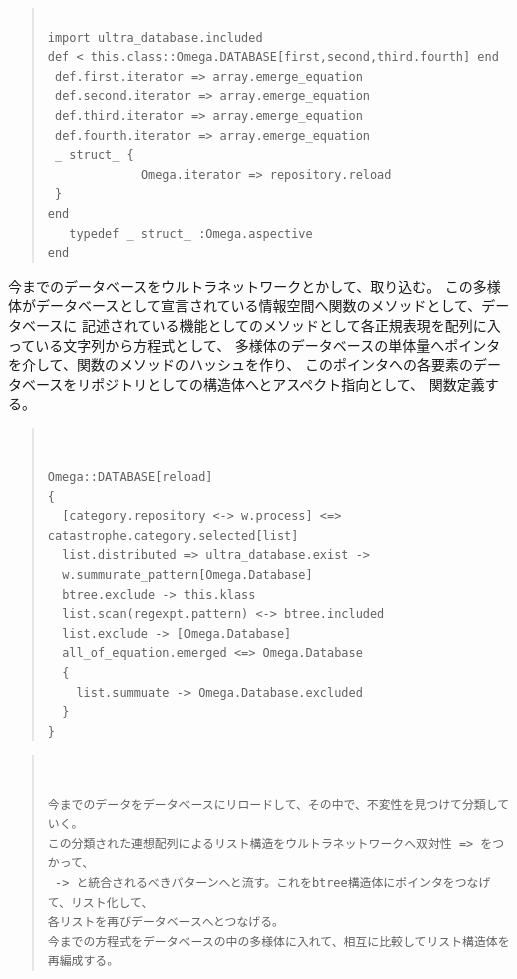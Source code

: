 \documentclass{jsarticle}
\begin{document}
   
\begin{quote}
\setlength{\baselineskip}{12pt}
\begin{verbatim}

import ultra_database.included
def < this.class::Omega.DATABASE[first,second,third.fourth] end
 def.first.iterator => array.emerge_equation
 def.second.iterator => array.emerge_equation
 def.third.iterator => array.emerge_equation
 def.fourth.iterator => array.emerge_equation
 _ struct_ {
             Omega.iterator => repository.reload
 } 
end
   typedef _ struct_ :Omega.aspective
end
 \end{verbatim}
\end{quote}

今までのデータベースをウルトラネットワークとかして、取り込む。
この多様体がデータベースとして宣言されている情報空間へ関数のメソッドとして、データベースに
記述されている機能としてのメソッドとして各正規表現を配列に入っている文字列から方程式として、
多様体のデータベースの単体量へポインタを介して、関数のメソッドのハッシュを作り、
このポインタへの各要素のデータベースをリポジトリとしての構造体へとアスペクト指向として、
関数定義する。

\begin{quote}
\setlength{\baselineskip}{12pt}
\begin{verbatim}


Omega::DATABASE[reload]
{ 
  [category.repository <-> w.process] <=> catastrophe.category.selected[list]
  list.distributed => ultra_database.exist -> 
  w.summurate_pattern[Omega.Database]
  btree.exclude -> this.klass
  list.scan(regexpt.pattern) <-> btree.included
  list.exclude -> [Omega.Database]
  all_of_equation.emerged <=> Omega.Database
  {
    list.summuate -> Omega.Database.excluded
  }
}
\end{verbatim}
\end{quote}
   
\begin{quote}
\setlength{\baselineskip}{12pt}
\begin{verbatim}


今までのデータをデータベースにリロードして、その中で、不変性を見つけて分類していく。
この分類された連想配列によるリスト構造をウルトラネットワークへ双対性 => をつかって、
 -> と統合されるべきパターンへと流す。これをbtree構造体にポインタをつなげて、リスト化して、
各リストを再びデータベースへとつなげる。
今までの方程式をデータベースの中の多様体に入れて、相互に比較してリスト構造体を再編成する。
\end{verbatim}
\end{quote}
 
\end{document}
